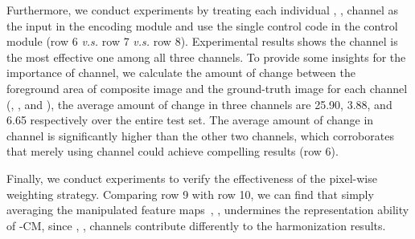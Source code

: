 \documentclass[sigconf]{acmart}
\begin{document}
Furthermore, we conduct experiments by treating each individual , ,  channel as the input in the encoding module and use the single control code in the control module (row 6 \emph{v.s.} row 7 \emph{v.s.} row 8). 
Experimental results shows the  channel is the most effective one among all three channels. 
To provide some insights for the importance of  channel, we calculate the amount of change between the foreground area of composite image and the ground-truth image for each channel (, , and ), the average amount of change in three channels are 25.90, 3.88, and 6.65 respectively over the entire test set.
The average amount of change in  channel is significantly higher than the other two channels, which corroborates that merely using  channel could achieve compelling results (row 6). 

Finally, we conduct experiments to verify the effectiveness of the pixel-wise weighting strategy.
Comparing row 9 with row 10, we can find that simply averaging the manipulated feature maps~, ,  undermines the representation ability of -CM, since , ,  channels contribute differently to the harmonization results.
\end{document}
